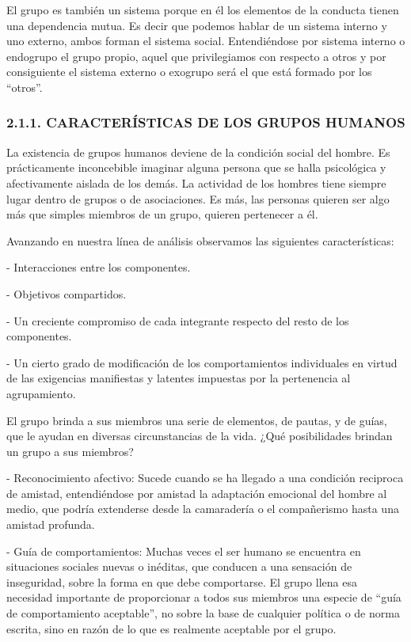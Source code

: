 El grupo es también un sistema porque en él los elementos de la conducta tienen una dependencia mutua. Es decir que podemos hablar de un sistema interno y uno externo, ambos forman el sistema social. Entendiéndose por sistema interno o endogrupo el grupo propio, aquel que privilegiamos con respecto a otros y por consiguiente el sistema externo o exogrupo será el que está formado por los “otros”.

\subsubsection*{2.1.1. CARACTERÍSTICAS DE LOS GRUPOS HUMANOS}
La existencia de grupos humanos deviene de la condición social del hombre. Es prácticamente inconcebible imaginar alguna persona que se halla psicológica y afectivamente aislada de los demás. La actividad de los hombres tiene siempre lugar dentro de grupos o de asociaciones. Es más, las personas quieren ser algo más que simples miembros de un grupo, quieren pertenecer a él.

Avanzando en nuestra línea de análisis observamos las siguientes características:

- Interacciones entre los componentes.

- Objetivos compartidos.



- Un creciente compromiso de cada integrante respecto del resto de los componentes.

- Un cierto grado de modificación de los comportamientos individuales en virtud de las exigencias manifiestas y latentes impuestas por la pertenencia al agrupamiento.

El grupo brinda a sus miembros una serie de elementos, de pautas, y de guías, que le ayudan en diversas circunstancias de la vida. ¿Qué posibilidades brindan un grupo a sus miembros?

- Reconocimiento afectivo: Sucede cuando se ha llegado a una condición reciproca de amistad, entendiéndose por amistad la adaptación emocional del hombre al medio, que podría extenderse desde la camaradería o el compañerismo hasta una amistad profunda.

- Guía de comportamientos: Muchas veces el ser humano se encuentra en situaciones sociales nuevas o inéditas, que conducen a una sensación de inseguridad, sobre la forma en que debe comportarse. El grupo llena esa necesidad importante de proporcionar a todos sus miembros una especie de “guía de comportamiento aceptable”, no sobre la base de cualquier política o de norma escrita, sino en razón de lo que es realmente aceptable por el grupo.

